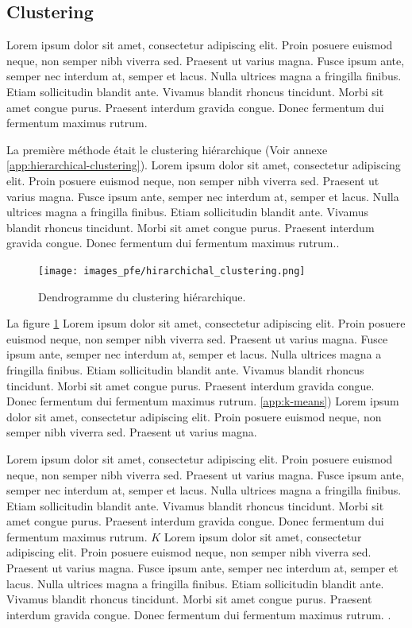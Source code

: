 \subsection{Clustering}
Lorem ipsum dolor sit amet, consectetur adipiscing elit. Proin posuere euismod neque, non semper nibh viverra sed. Praesent ut varius magna. Fusce ipsum ante, semper nec interdum at, semper et lacus. Nulla ultrices magna a fringilla finibus. Etiam sollicitudin blandit ante. Vivamus blandit rhoncus tincidunt. Morbi sit amet congue purus. Praesent interdum gravida congue. Donec fermentum dui fermentum maximus rutrum.

\medskip

La première méthode était le clustering hiérarchique (Voir annexe \ref{app:hierarchical-clustering}). Lorem ipsum dolor sit amet, consectetur adipiscing elit. Proin posuere euismod neque, non semper nibh viverra sed. Praesent ut varius magna. Fusce ipsum ante, semper nec interdum at, semper et lacus. Nulla ultrices magna a fringilla finibus. Etiam sollicitudin blandit ante. Vivamus blandit rhoncus tincidunt. Morbi sit amet congue purus. Praesent interdum gravida congue. Donec fermentum dui fermentum maximus rutrum..

\begin{figure}[hbt!]
  \centering
  \texttt{[image: images\_pfe/hirarchichal\_clustering.png]}
  \caption{Dendrogramme du clustering hiérarchique.}
  \label{fig:hierarchical-clustering}
\end{figure}
\FloatBarrier

La figure \ref{fig:hierarchical-clustering} Lorem ipsum dolor sit amet, consectetur adipiscing elit. Proin posuere euismod neque, non semper nibh viverra sed. Praesent ut varius magna. Fusce ipsum ante, semper nec interdum at, semper et lacus. Nulla ultrices magna a fringilla finibus. Etiam sollicitudin blandit ante. Vivamus blandit rhoncus tincidunt. Morbi sit amet congue purus. Praesent interdum gravida congue. Donec fermentum dui fermentum maximus rutrum. \ref{app:k-means}) Lorem ipsum dolor sit amet, consectetur adipiscing elit. Proin posuere euismod neque, non semper nibh viverra sed. Praesent ut varius magna. 

\medskip

Lorem ipsum dolor sit amet, consectetur adipiscing elit. Proin posuere euismod neque, non semper nibh viverra sed. Praesent ut varius magna. Fusce ipsum ante, semper nec interdum at, semper et lacus. Nulla ultrices magna a fringilla finibus. Etiam sollicitudin blandit ante. Vivamus blandit rhoncus tincidunt. Morbi sit amet congue purus. Praesent interdum gravida congue. Donec fermentum dui fermentum maximus rutrum. $K$ Lorem ipsum dolor sit amet, consectetur adipiscing elit. Proin posuere euismod neque, non semper nibh viverra sed. Praesent ut varius magna. Fusce ipsum ante, semper nec interdum at, semper et lacus. Nulla ultrices magna a fringilla finibus. Etiam sollicitudin blandit ante. Vivamus blandit rhoncus tincidunt. Morbi sit amet congue purus. Praesent interdum gravida congue. Donec fermentum dui fermentum maximus rutrum. \parencite{kassambara_determining_nodate}.

